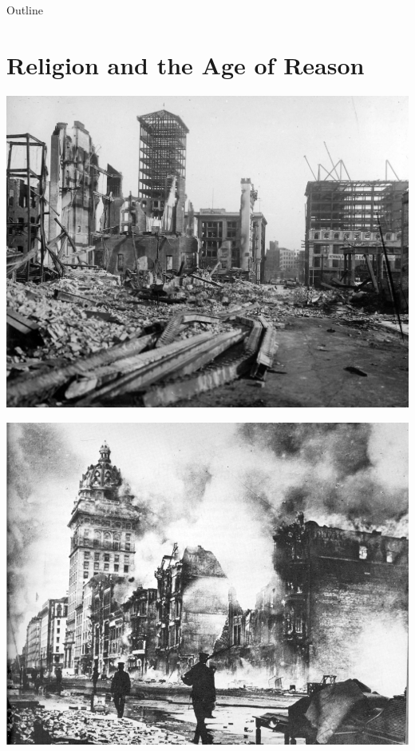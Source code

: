 

\maketitle
\begin{frame}{Outline}
\setcounter{tocdepth}{1}
\tableofcontents
\end{frame}

\section{Religion and the Age of Reason}
\label{sec-1}
\begin{frame}[label=sec-1-1]{}
\includegraphics[width=.9\linewidth]{./img/sf-quakes.jpg}
\end{frame}

\begin{frame}[label=sec-1-2]{}
\includegraphics[width=.9\linewidth]{./img/sfeq06_01.jpg}
\end{frame}

